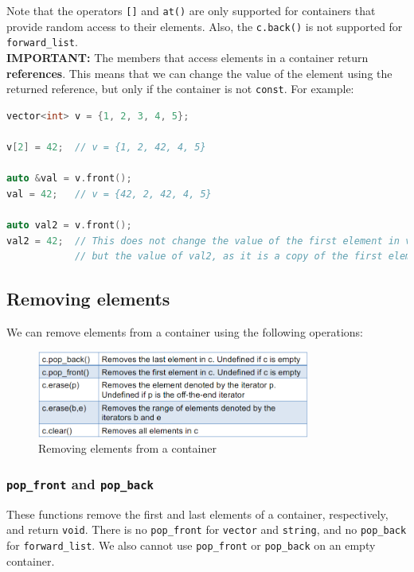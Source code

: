 Note that the operators \texttt{[]} and \texttt{at()} are only supported for containers
that provide random access to their elements. Also, the \texttt{c.back()} is not supported
for \texttt{forward\_list}.\\

\textbf{IMPORTANT:} The members that access elements in a container return \textbf{references}.
This means that we can change the value of the element using the returned reference, but only if
the container is not \texttt{const}. For example:

\begin{lstlisting}[language=C++]
vector<int> v = {1, 2, 3, 4, 5};

v[2] = 42;  // v = {1, 2, 42, 4, 5}

auto &val = v.front();
val = 42;   // v = {42, 2, 42, 4, 5}

auto val2 = v.front(); 
val2 = 42;  // This does not change the value of the first element in v,
            // but the value of val2, as it is a copy of the first element.
\end{lstlisting}

\subsection{Removing elements}

We can remove elements from a container using the following operations:

\begin{figure}[H]
    \centering
    \includegraphics[width=0.8\textwidth]{figures/erasing_elems.png}
    \caption{Removing elements from a container}
    \label{fig:removing_elements}
\end{figure}

\subsubsection{\texttt{pop\_front} and \texttt{pop\_back}}

These functions remove the first and last elements of a container, respectively, and return
\texttt{void}. There is no \texttt{pop\_front} for \texttt{vector} and \texttt{string}, and
no \texttt{pop\_back} for \texttt{forward\_list}. We also cannot use \texttt{pop\_front} or
\texttt{pop\_back} on an empty container.

